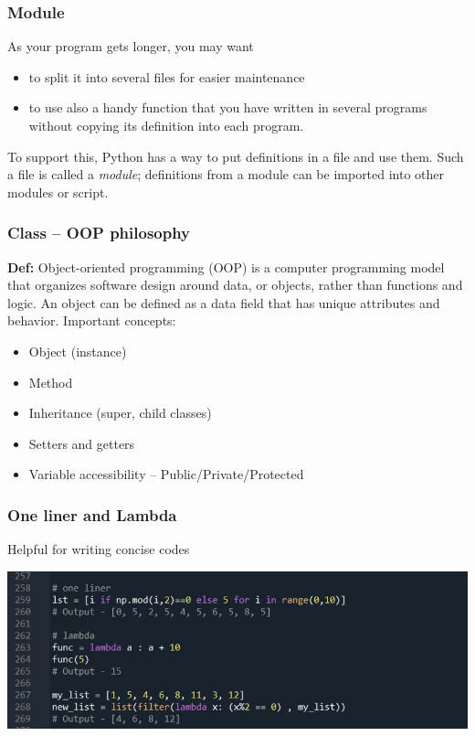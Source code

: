 \documentclass{beamer}
\begin{document}
\begin{frame}
\frametitle{Module}

As your program gets longer, you may want
\begin{itemize}
    \item to split it into several files 
    for easier maintenance
    \item to use also a handy function that
    you have written in several programs without copying its definition into each 
    program.
\end{itemize}

\vskip 2mm 

To support this, Python has a way to put definitions in a file
and use them. Such a file is called a \textit{module}; definitions from 
a module can be imported into other modules or script. 

\end{frame}


\begin{frame}
\frametitle{Class – OOP philosophy}

\textbf{Def:} Object-oriented programming (OOP) is a computer programming 
model that organizes software design around data, or objects, 
rather than functions and logic. An object can be defined as a 
data field that has unique attributes and behavior.
\vskip 2mm 
Important concepts:
    \begin{itemize}
        \item Object (instance)
        \item Method
        \item Inheritance (super, child classes)
        \item Setters and getters
        \item Variable accessibility – Public/Private/Protected
    \end{itemize}
\end{frame}

\begin{frame}
\frametitle{One liner and Lambda}
    Helpful for writing concise codes
        \begin{center}
            \includegraphics[scale=0.5]{figures/one_liner.jpg}
        \end{center}
\end{frame}
\end{document}
